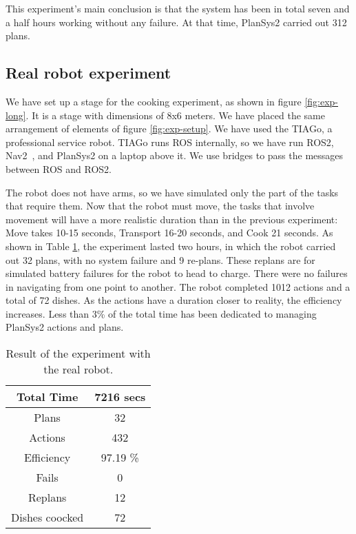 \documentclass[letterpaper, 10 pt, conference]{IEEEtran}
\begin{document}
This experiment's main conclusion is that the system has been in total seven and a half hours working without any failure. At that time, PlanSys2 carried out 312 plans.

\subsection{Real robot experiment}

We have set up a stage for the cooking experiment, as shown in figure \ref{fig:exp-long}. It is a stage with dimensions of 8x6 meters. We have placed the same arrangement of elements of figure \ref{fig:exp-setup}. We have used the TIAGo, a professional service robot. TIAGo runs ROS internally, so we have run ROS2, Nav2~\cite{macenski2020marathon2}, and PlanSys2 on a laptop above it. We use bridges to pass the messages between ROS and ROS2.


The robot does not have arms, so we have simulated only the part of the tasks that require them. Now that the robot must move, the tasks that involve movement will have a more realistic duration than in the previous experiment: Move takes 10-15 seconds, Transport 16-20 seconds, and Cook 21 seconds. As shown in Table \ref{tab:exp2}, the experiment lasted two hours, in which the robot carried out 32 plans, with no system failure and 9 re-plans. These replans are for simulated battery failures for the robot to head to charge. There were no failures in navigating from one point to another. The robot completed 1012 actions and a total of 72 dishes. As the actions have a duration closer to reality, the efficiency increases. Less than 3\% of the total time has been dedicated to managing PlanSys2 actions and plans.


\begin{table}[ht]
\caption{\label{tab:exp2}Result of the experiment with the real robot.}
\centering
\begin{tabular}{|c|c|}
\hline 
Total Time & 7216 secs \\\hline 
Plans & 32        \\\hline 
Actions & 432       \\\hline 
Efficiency & 97.19 \%      \\\hline 
Fails & 0       \\\hline 
Replans & 12    \\\hline 
Dishes coocked & 72    \\\hline 
\end{tabular}
\end{table}
\end{document}
